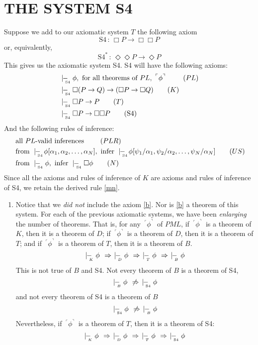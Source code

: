 \documentclass[landscape, two column, full page,reqno]{article}
\newcommand{\qe}{\begin{enumerate}[align=left,style=nextline,leftmargin=17pt,labelsep=5pt,font=\normalfont]}
\newcommand{\ze}{\end{enumerate}}
\newcommand{\p}{\item}
\newcommand{\e}{\emph}
\newcommand{\fns}[1]{{\footnotesize #1}}
\newcommand{\qq}[1]{ ~\!^\ulcorner #1  ^\urcorner~\!}
\newcommand{\kproves}{\mid\hspace{-3.9pt}-_{\!\!\!\raisebox{-3pt}{\text{\tiny$K$}}}\hspace{3pt}}
\newcommand{\dproves}{\mid\hspace{-3.9pt}-_{\!\!\!\raisebox{-3pt}{\text{\tiny$D$}}}\hspace{3pt}}
\newcommand{\tproves}{\mid\hspace{-3.9pt}-_{\!\!\!\raisebox{-3pt}{\text{\tiny$T$}}}\hspace{3pt}}
\newcommand{\bproves}{\mid\hspace{-3.9pt}-_{\!\!\!\raisebox{-3pt}{\text{\tiny$B$}}}\hspace{3pt}}
\newcommand{\sfourproves}{\mid\hspace{-3.9pt}-_{\!\!\!\raisebox{-3pt}{\text{\tiny S4}}}\hspace{3pt}}
\newcommand{\D}{\Diamond}
\newcommand{\B}{\Box}
\newcommand{\hs}{\hspace{2pt}}
\begin{document}
\section{T\fns{HE} S\fns{YSTEM} S4}
\p Suppose we add to our axiomatic system $T$ the following axiom
	\[
	\mbox{S4} \hs:\hs \B P \to \B\B P
	\]
or, equivalently,	
	\[
	\mbox{S4}^* \hs:\hs \D \D P \to \D P
	\]
This gives us the axiomatic system {S4}.     S4 will have the following axioms:
		\begin{align}
		& \sfourproves \phi, \text{ for all theorems of $PL$, $\qq{\phi}$ }			\tag{$PL$}\label{plt}	\\
		& \sfourproves\B( P \to Q) \to (\B P \to \B Q)	\tag{$K$}\label{k}	\\
		& \sfourproves \B P \to P			\tag{$T$} \label{t}			\\
		& \sfourproves \B P \to \B \B P		\tag{S4} \label{s4}
		 \end{align}
And the following rules of inference:
		\begin{align}
		&\text{ all $PL$-valid inferences }	\tag{$PLR$}\label{plr}	\\
		&\text{ from } \sfourproves \!\phi[\alpha_1, \alpha_2, \dots, \alpha_N] , \text{ infer } \sfourproves \!\phi [\psi_1/\alpha_1, \psi_2/\alpha_2, \dots, \psi_N/\alpha_N]	\tag{$US$}\label{us}\\
		& \mbox{ from } \sfourproves \phi, \mbox{ infer } \sfourproves \B \phi \tag{$N$}\label{n}
		\end{align}
Since all the axioms and rules of inference of $K$ are axioms and rules of inference of S4, we retain the derived rule \eqref{mn}.
		\qe
		\p Notice that we \e{did not} include the axiom \eqref{b}.  Nor is \eqref{b} a theorem of this system.  For each of the previous axiomatic systems, we have been \e{enlarging} the number of theorems.  That is, for any $\qq{\phi}$ of $PML$, if $\qq{\phi}$ is a theorem of $K$, then it is a theorem of $D$; if $\qq{\phi}$ is a theorem of $D$, then it is a theorem of $T$; and if $\qq{\phi}$ is a theorem of $T$, then it is a theorem of $B$.
	\[
	\kproves \phi \hs\hs\Rightarrow\hs\hs \dproves \phi \hs\hs\Rightarrow\hs\hs \tproves \phi \hs\hs\Rightarrow\hs\hs \bproves \phi
	\]
This is not true of $B$ and S4.   Not every theorem of $B$ is a theorem of S4, 
	\[
	\bproves \phi \hs\hs\not\Rightarrow\hs\hs \sfourproves \phi
	\]
and not every theorem of S4 is a theorem of $B$
	\[
	\sfourproves \phi \hs\hs\not\Rightarrow\hs\hs \bproves \phi
	\]
Nevertheless, if $\qq{\phi}$  is a theorem of $T$, then it is a theorem of S4:
	\[
	\kproves \phi \hs\hs\Rightarrow\hs\hs \dproves \phi \hs\hs\Rightarrow\hs\hs \tproves \phi \hs\hs\Rightarrow\hs\hs \sfourproves \phi
	\]
	\ze 
		
\end{document}
